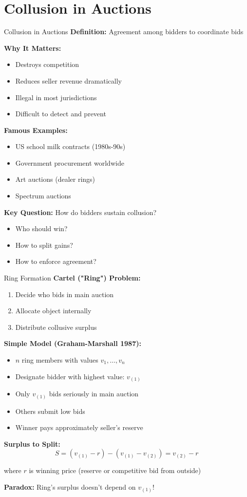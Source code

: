 \documentclass[xcolor={x11names}, aspectratio=169 ]{beamer}
\begin{document}
\section{Collusion in Auctions}

\begin{frame}{Collusion in Auctions}
\textbf{Definition:} Agreement among bidders to coordinate bids

\textbf{Why It Matters:}
\begin{itemize}
  \item Destroys competition
  \item Reduces seller revenue dramatically
  \item Illegal in most jurisdictions
  \item Difficult to detect and prevent
\end{itemize}

\textbf{Famous Examples:}
\begin{itemize}
  \item US school milk contracts (1980s-90s)
  \item Government procurement worldwide
  \item Art auctions (dealer rings)
  \item Spectrum auctions
\end{itemize}

\textbf{Key Question:} How do bidders sustain collusion?
\begin{itemize}
  \item Who should win?
  \item How to split gains?
  \item How to enforce agreement?
\end{itemize}
\end{frame}

\begin{frame}{Ring Formation}
\textbf{Cartel ("Ring") Problem:}
\begin{enumerate}
  \item Decide who bids in main auction
  \item Allocate object internally
  \item Distribute collusive surplus
\end{enumerate}

\textbf{Simple Model (Graham-Marshall 1987):}
\begin{itemize}
  \item $n$ ring members with values $v_1, \ldots, v_n$
  \item Designate bidder with highest value: $v_{(1)}$
  \item Only $v_{(1)}$ bids seriously in main auction
  \item Others submit low bids
  \item Winner pays approximately seller's reserve
\end{itemize}

\textbf{Surplus to Split:}
$$S = (v_{(1)} - r) - (v_{(1)} - v_{(2)}) = v_{(2)} - r$$

where $r$ is winning price (reserve or competitive bid from outside)

\textbf{Paradox:} Ring's surplus doesn't depend on $v_{(1)}$!
\end{frame}
\end{document}
